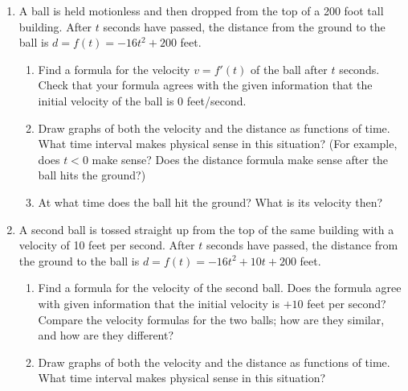 \begin{enumerate}
\begin{enumerate}
  \item When the radius is 4 inches, approximately how much does it
increase if the volume is increased by 50 cubic inches?

  \item Suppose someone is inflating the balloon at the rate of 10 cubic
inches of air per second.  If the radius is 4 inches, at what rate is
it increasing, in inches per second?



\end{enumerate}
\item A ball is held motionless and then dropped from the top of a 200
foot tall building. After $t$ seconds have
passed, the distance from the ground to the ball is $d=f(t) = -16t^2 +
200$ feet.

  \begin{enumerate}
  \item Find a formula for the velocity $v=f'(t)$ of the ball after $t$
seconds.  Check that your formula agrees with the given information
that the initial velocity of the ball is 0 feet/second.

  \item Draw graphs of both the velocity and the distance as functions of
time.  What time interval makes physical sense in this situation?
(For example, does $t<0$ make sense?  Does the distance formula make
sense after the ball hits the ground?)


  \item At what time does the ball hit the ground?  What is its velocity
then?



\end{enumerate}
\item A second ball is tossed straight up from the top of the same
building with a velocity of 10 feet per second.  After $t$ seconds
have passed, the distance from the ground to the ball is $d=f(t) =
-16t^2 + 10t + 200$ feet.

  \begin{enumerate}
  \item Find a formula for the velocity of the second ball.  Does the
formula agree with given information that the initial velocity is
$+10$ feet per second?  Compare the velocity formulas for the two
balls; how are they similar, and how are they different?

  \item Draw graphs of both the velocity and the distance as functions of
time.  What time interval makes physical sense in this situation?


\end{enumerate}
\end{enumerate}
